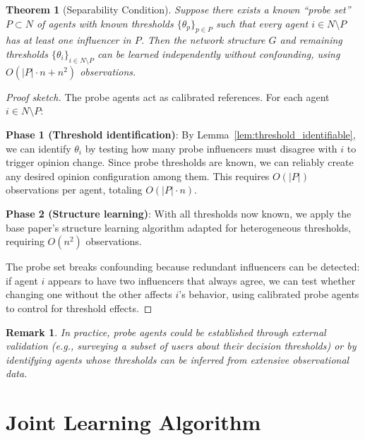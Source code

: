 \documentclass[11pt]{article}
\newtheorem{theorem}{Theorem}
\newtheorem{remark}{Remark}
\begin{document}
\begin{theorem}[Separability Condition]
\label{thm:separability}
Suppose there exists a known ``probe set'' $P \subset N$ of agents with known thresholds $\{\theta_p\}_{p \in P}$ such that every agent $i \in N \setminus P$ has at least one influencer in $P$. Then the network structure $G$ and remaining thresholds $\{\theta_i\}_{i \in N \setminus P}$ can be learned independently without confounding, using $O(|P| \cdot n + n^2)$ observations.
\end{theorem}

\begin{proof}[Proof sketch]
The probe agents act as calibrated references. For each agent $i \in N \setminus P$:

\textbf{Phase 1 (Threshold identification)}: By Lemma~\ref{lem:threshold_identifiable}, we can identify $\theta_i$ by testing how many probe influencers must disagree with $i$ to trigger opinion change. Since probe thresholds are known, we can reliably create any desired opinion configuration among them. This requires $O(|P|)$ observations per agent, totaling $O(|P| \cdot n)$.

\textbf{Phase 2 (Structure learning)}: With all thresholds now known, we apply the base paper's structure learning algorithm adapted for heterogeneous thresholds, requiring $O(n^2)$ observations.

The probe set breaks confounding because redundant influencers can be detected: if agent $i$ appears to have two influencers that always agree, we can test whether changing one without the other affects $i$'s behavior, using calibrated probe agents to control for threshold effects.
\end{proof}

\begin{remark}
In practice, probe agents could be established through external validation (e.g., surveying a subset of users about their decision thresholds) or by identifying agents whose thresholds can be inferred from extensive observational data.
\end{remark}

\section{Joint Learning Algorithm}
\label{sec:algorithm}
\end{document}

